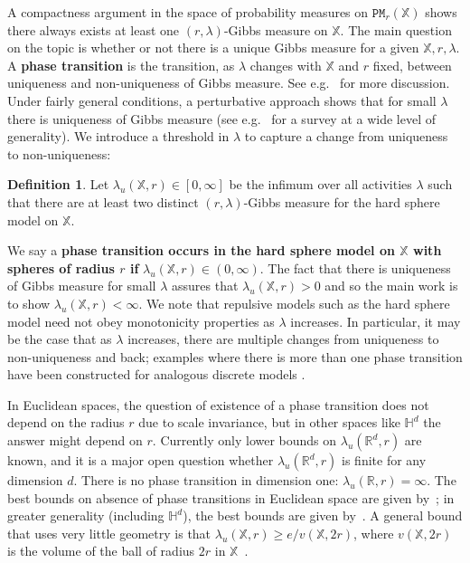 \documentclass[11pt]{amsart}
\theoremstyle{definition}
\newtheorem{definition}[theorem]{Definition}
\theoremstyle{remark}
\renewcommand{\H}{\mathbb{H}}
\newcommand{\R}{\mathbb{R}}
\newcommand{\bX}{\mathbb{X}}
\newcommand{\cP}{\mathtt{PM}}
\newcommand{\lam}{\lambda}
\begin{document}
A compactness argument in the space of probability measures on $\cP_r(\bX)$ shows there always exists at least one $(r,\lambda)$-Gibbs measure on $\bX$.  The main question on the topic is whether or not there is a unique Gibbs measure for a given $\bX, r, \lam$.  A {\bf phase transition} is the transition, as $\lam$ changes with $\bX$ and $r$ fixed, between uniqueness and non-uniqueness of Gibbs measure.  See e.g.~\cite{ruelle1999statistical,georgii1997stochastic,friedli2017statistical} for more   discussion.  Under fairly general conditions, a perturbative approach shows that for small $\lambda$ there is uniqueness of Gibbs measure (see e.g.\ \cite{jansen2019cluster} for a survey at a wide level of generality).  We introduce a threshold in $\lambda$ to capture a change from uniqueness to non-uniqueness:


\begin{definition}
Let $\lambda_{u}(\bX,r) \in [0,\infty]$ be the infimum over all activities $\lambda$ such that there are at least two distinct $(r,\lam)$-Gibbs measure for the hard sphere model on $\bX$. 
\end{definition}

We say a {\bf phase transition occurs in the hard sphere model on $\bX$ with spheres of radius $r$ if} $\lambda_u(\bX,r) \in (0,\infty)$.  The fact that there is uniqueness of Gibbs measure for small $\lambda$ assures that $\lambda_u(\bX,r) > 0$ and so the main work is to show $\lambda_u(\bX,r) < \infty$.
We note that repulsive models such as the hard sphere model need not obey monotonicity properties as $\lambda$ increases.  In particular, it may be the case that as $\lambda$ increases, there are multiple changes from uniqueness to non-uniqueness and back; examples where there is more than one phase transition have been constructed for analogous discrete models \cite{brightwell1999nonmonotonic}.

In Euclidean spaces, the question of existence of a phase transition  does not depend on the radius $r$ due to scale invariance, but in other spaces like $\H^d$ the answer might depend on $r$.    Currently only lower bounds on $\lam_u(\R^d,r)$ are known,  and it is a major open question whether $\lambda_u(\R^d, r)$ is finite for any dimension $d$.   There is no phase transition in dimension one: $\lam_u(\R,r)=\infty$. {The best bounds on absence of phase transitions in Euclidean space are given by~\cite{gobel2026uniquenessanalyticitymixinggibbs}; in greater generality (including $\H^d$), the best bounds are given by~\cite{michelen2021potential}.  A general bound that uses very little geometry is that $\lam_u(\bX,r) \ge e/ v(\bX,2r)$, where $v(\bX,2r)$ is  the volume of the ball of radius $2r$ in $\bX$~\cite{michelen2020analyticity,michelen2021potential}.}
\end{document}

